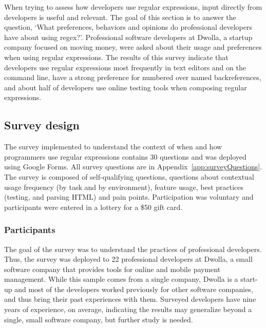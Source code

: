 When trying to assess how developers use regular expressions, input directly from developers is useful and relevant.  The goal of this section is to answer the question, `What preferences, behaviors and opinions do professional developers have about using regex?'.  Professional software developers at Dwolla, a startup company focused on moving money, were asked about their usage and preferences when using regular expressions.  The results of this survey indicate that developers use regular expressions most frequently in text editors and on the command line, have a strong preference for numbered over named backreferences, and about half of developers use online testing tools when composing regular expressions.

\subsection{Survey design}

The survey implemented to understand the context of when and how programmers use regular expressions contains 30 questions and was deployed using Google Forms.
All survey questions are in Appendix~\ref{app:surveyQuestions}. The survey is composed of self-qualifying questions, questions about contextual usage frequency (by task and by environment), feature usage, best practices (testing, and parsing HTML) and pain points.  Participation was voluntary and participants were entered in a lottery for a \$50 gift card.


\subsubsection{Participants}
The goal of the survey was to understand the practices of professional developers. Thus, the survey was deployed to 22 professional developers at Dwolla, a small software company that provides tools for online and mobile payment management. While this sample comes from a single company, Dwolla is a start-up and most of the developers worked previously for other software companies, and thus bring their past experiences with them. Surveyed developers have nine years of experience, on average, indicating the results may generalize beyond a single, small software company, but further study is needed.

